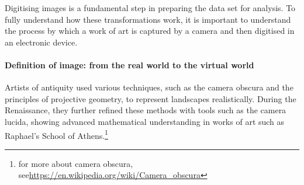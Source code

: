\begin{toReview}
Digitising images is a fundamental step in preparing the data set for analysis. To fully understand how these transformations work, it is important to understand the process by which a work of art is captured by a camera and then digitised in an electronic device.

\paragraph{Definition of image: from the real world to the virtual world}
Artists of antiquity used various techniques, such as the camera obscura and the principles of projective geometry, to represent landscapes realistically. During the Renaissance, they further refined these methods with tools such as the camera lucida, showing advanced mathematical understanding in works of art such as Raphael's School of Athens.\footnote{for more about camera obscura, see\newline\url{https://en.wikipedia.org/wiki/Camera_obscura}}


\end{toReview}
